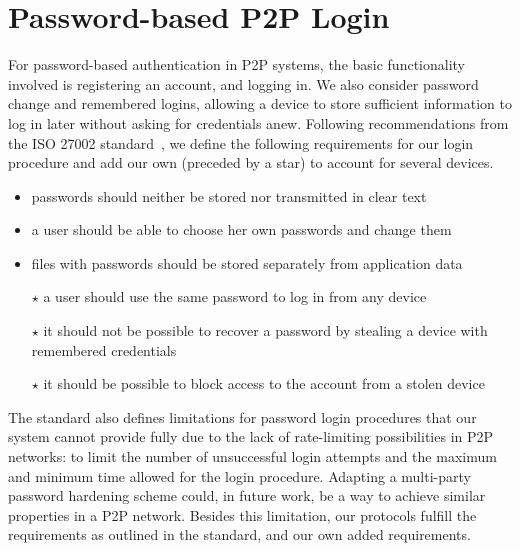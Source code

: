 \section{Password-based P2P Login} 
For password-based authentication
in P2P systems, the basic functionality involved is registering an account,
and logging in. We also consider password change and remembered logins,
allowing a device to store sufficient information to log in %
later without asking for credentials
anew. Following recommendations from the ISO 27002 standard~\cite{iso27002}, we define the
following requirements for our login procedure and add our
own (preceded by a star) to account for several devices.
\begin{itemize}
\item passwords should neither be stored nor transmitted in clear text
\item a user should be able to choose her own passwords and change them
\item files with passwords should be stored separately from application data 
\item[$\star$] a user should use the same password to log in from any device
\item[$\star$] it should not be possible to recover a password by stealing a
device with remembered credentials
\item[$\star$] it should be possible to block access to the account from a
stolen device
\end{itemize}
The standard also defines limitations for password login procedures
that our system cannot provide fully due to the lack of rate-limiting
possibilities in P2P networks: to limit the number of unsuccessful
login attempts and the maximum and minimum time allowed for the
login procedure.  Adapting a multi-party password hardening scheme
\cite{FordK00} could, in future work, be a way to achieve similar
properties in a P2P network. Besides this limitation, our protocols
fulfill the requirements as outlined in the standard, and our
own added requirements.


